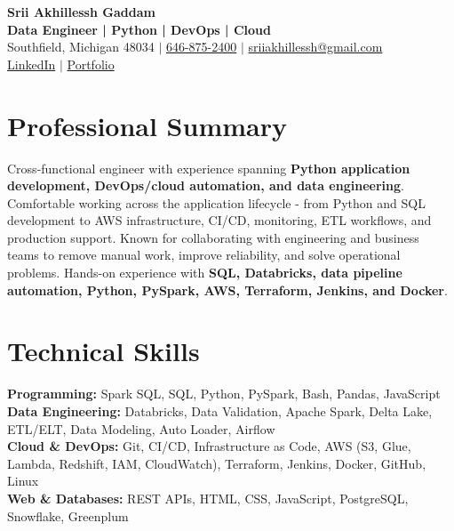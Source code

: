 \documentclass[letterpaper,10pt]{article}
\begin{document}
\fontsize{9.35pt}{10.45pt}\selectfont

\begin{center}
    {\LARGE \textbf{Srii Akhillessh Gaddam}} \\[-1pt]
    \textbf{Data Engineer | Python | DevOps | Cloud} \\[2pt]
    Southfield, Michigan 48034 $|$
    \href{tel:6468752400}{646-875-2400} $|$
    \href{mailto:sriiakhillessh@gmail.com}{sriiakhillessh@gmail.com} \\[1pt]
    \href{https://www.linkedin.com/in/srii-akhiilessh-gaddam-b48668191/}{LinkedIn} $|$
    \href{https://sriiakhillesshg.github.io/portfolio/}{Portfolio}
\end{center}
\vspace{-8pt}

\section{Professional Summary}
\small{Cross-functional engineer with experience spanning \textbf{Python application development, DevOps/cloud automation, and data engineering}. Comfortable working across the application lifecycle - from Python and SQL development to AWS infrastructure, CI/CD, monitoring, ETL workflows, and production support. Known for collaborating with engineering and business teams to remove manual work, improve reliability, and solve operational problems. Hands-on experience with \textbf{SQL, Databricks, data pipeline automation, Python, PySpark, AWS, Terraform, Jenkins, and Docker}.}

\section{Technical Skills}
\small{
\textbf{Programming:} Spark SQL, SQL, Python, PySpark, Bash, Pandas, JavaScript \\
\textbf{Data Engineering:} Databricks, Data Validation, Apache Spark, Delta Lake, ETL/ELT, Data Modeling, Auto Loader, Airflow \\
\textbf{Cloud \& DevOps:} Git, CI/CD, Infrastructure as Code, AWS (S3, Glue, Lambda, Redshift, IAM, CloudWatch), Terraform, Jenkins, Docker, GitHub, Linux \\
\textbf{Web \& Databases:} REST APIs, HTML, CSS, JavaScript, PostgreSQL, Snowflake, Greenplum
}
\end{document}
